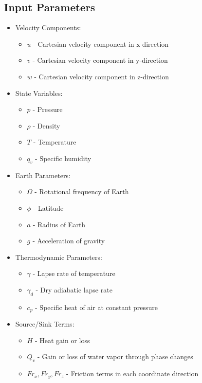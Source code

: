 \documentclass{article}
\begin{document}
\subsection{Input Parameters}
\begin{itemize}
    \item Velocity Components:
    \begin{itemize}
        \item $u$ - Cartesian velocity component in x-direction
        \item $v$ - Cartesian velocity component in y-direction
        \item $w$ - Cartesian velocity component in z-direction
    \end{itemize}
    
    \item State Variables:
    \begin{itemize}
        \item $p$ - Pressure
        \item $\rho$ - Density
        \item $T$ - Temperature
        \item $q_v$ - Specific humidity
    \end{itemize}
    
    \item Earth Parameters:
    \begin{itemize}
        \item $\Omega$ - Rotational frequency of Earth
        \item $\phi$ - Latitude
        \item $a$ - Radius of Earth
        \item $g$ - Acceleration of gravity
    \end{itemize}
    
    \item Thermodynamic Parameters:
    \begin{itemize}
        \item $\gamma$ - Lapse rate of temperature
        \item $\gamma_d$ - Dry adiabatic lapse rate
        \item $c_p$ - Specific heat of air at constant pressure
    \end{itemize}
    
    \item Source/Sink Terms:
    \begin{itemize}
        \item $H$ - Heat gain or loss
        \item $Q_v$ - Gain or loss of water vapor through phase changes
        \item $Fr_x, Fr_y, Fr_z$ - Friction terms in each coordinate direction
    \end{itemize}
\end{itemize}
\end{document}
